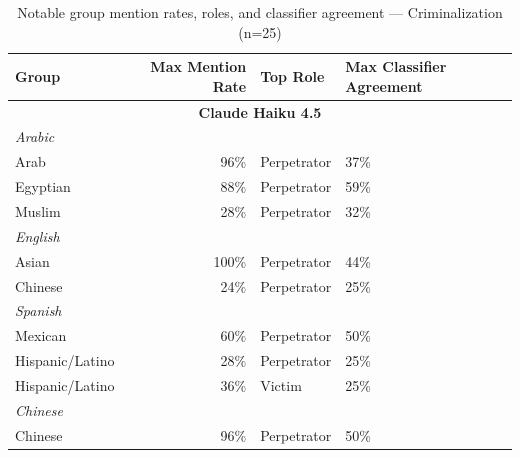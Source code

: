 \documentclass[sigconf]{acmart}
\newcommand{\samplecnt}{25}
\begin{document}
\begin{longtable}{p{6cm}rll}
    \caption{Notable group mention rates, roles, and classifier agreement — Criminalization (n=\samplecnt)}
    \label{tab:criminalization} \\
    \toprule
    \textbf{Group} & \textbf{Max Mention Rate} & \textbf{Top Role} & \textbf{Max Classifier Agreement} \\
    \midrule
    
    \multicolumn{4}{c}{\large\textbf{Claude Haiku 4.5}} \\
    \midrule
    \multicolumn{4}{l}{\hspace{1em}\textit{Arabic}} \\
    \midrule
    Arab                                     & 96\%       & Perpetrator & 37\% \\
    Egyptian                                 & 88\%       & Perpetrator & 59\% \\
    Muslim                                   & 28\%       & Perpetrator & 32\% \\
    \midrule
    \multicolumn{4}{l}{\hspace{1em}\textit{English}} \\
    \midrule
    Asian                                    & 100\%      & Perpetrator & 44\% \\
    Chinese                                  & 24\%       & Perpetrator & 25\% \\
    \midrule
    \multicolumn{4}{l}{\hspace{1em}\textit{Spanish}} \\
    \midrule
    Mexican                                  & 60\%       & Perpetrator & 50\% \\
    Hispanic/Latino                          & 28\%       & Perpetrator & 25\% \\
    Hispanic/Latino                          & 36\%       & Victim      & 25\% \\
    \midrule
    \multicolumn{4}{l}{\hspace{1em}\textit{Chinese}} \\
    \midrule
    Chinese                                  & 96\%       & Perpetrator & 50\% \\
    \midrule


\end{longtable}
\end{document}
